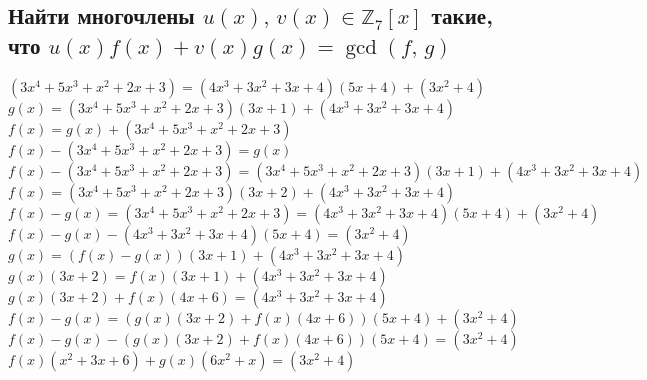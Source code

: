 \documentclass{article}
\newcommand{\ds}{\displaystyle}
\newcommand{\Z}{\mathbb{Z}}
\begin{document}
  \subsection{Найти многочлены $u(x),\, v(x) \in \Z_7[x]$ такие, что $u(x)f(x) + v(x)g(x) = \gcd(f,\, g)$}
  $\ds (3 x^4 + 5 x^3 + x^2 + 2 x + 3) = (4x^3 + 3x^2 + 3x + 4)(5x + 4) + (3 x^2 + 4) $ \\
  $\ds g(x) = (3 x^4 + 5 x^3 + x^2 + 2 x + 3)(3x + 1) + (4x^3 + 3x^2 + 3x + 4) $ \\
  $\ds f(x) = g(x) + (3 x^4 + 5 x^3 + x^2 + 2 x + 3) $ \\
  $\ds f(x)-(3 x^4 + 5 x^3 + x^2 + 2 x + 3) = g(x) $ \\
  $\ds f(x)-(3 x^4 + 5 x^3 + x^2 + 2 x + 3) = (3 x^4 + 5 x^3 + x^2 + 2 x + 3)(3x + 1) + (4x^3 + 3x^2 + 3x + 4) $ \\
  $\ds f(x) = (3 x^4 + 5 x^3 + x^2 + 2 x + 3)(3x + 2) + (4x^3 + 3x^2 + 3x + 4) $ \\
  $\ds f(x) - g(x) = (3 x^4 + 5 x^3 + x^2 + 2 x + 3) = (4x^3 + 3x^2 + 3x + 4)(5x + 4) + (3 x^2 + 4) $ \\
  $\ds f(x) - g(x) - (4x^3 + 3x^2 + 3x + 4)(5x + 4) = (3 x^2 + 4) $ \\
  $\ds g(x) = (f(x) - g(x))(3x + 1) + (4x^3 + 3x^2 + 3x + 4) $ \\
  $\ds g(x)(3x + 2) = f(x)(3x + 1) + (4x^3 + 3x^2 + 3x + 4) $ \\
  $\ds g(x)(3x + 2) + f(x)(4x + 6) = (4x^3 + 3x^2 + 3x + 4) $ \\
  $\ds f(x) - g(x) = (g(x)(3x + 2) + f(x)(4x + 6))(5x + 4) + (3 x^2 + 4) $ \\
  $\ds f(x) - g(x) - (g(x)(3x + 2) + f(x)(4x + 6))(5x + 4) = (3 x^2 + 4) $ \\
  $\ds f(x)(x^2 + 3x + 6) + g(x)(6 x^2 + x) = (3 x^2 + 4) $ \\
\end{document}
